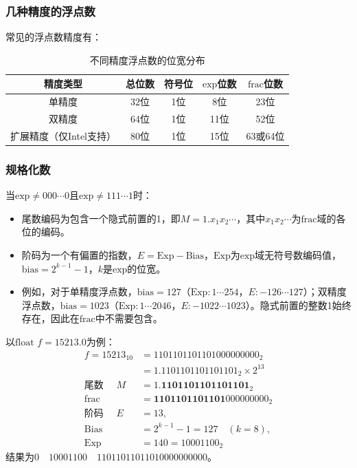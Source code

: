 \subsubsection{几种精度的浮点数}

常见的浮点数精度有：
\begin{table}[h]
    \centering
    \begin{tabular}{|c|c|c|c|c|}
        \hline
        精度类型           & 总位数 & 符号位 & \(\text{exp}\)位数 & \(\text{frac}\)位数 \\
        \hline
        单精度            & 32位 & 1位  & 8位               & 23位               \\
        双精度            & 64位 & 1位  & 11位              & 52位               \\
        扩展精度（仅Intel支持） & 80位 & 1位  & 15位              & 63或64位            \\
        \hline
    \end{tabular}
    \caption{不同精度浮点数的位宽分布}
\end{table}

\subsubsection{规格化数}
当\(\text{exp}\neq000\cdots0\)且\(\text{exp}\neq111\cdots1\)时：
\begin{itemize}
    \item 尾数编码为包含一个隐式前置的1，即\(M = 1.x_1 x_2{\cdots}\)，其中\(x_1x_2\cdots\)为\(\text{frac}\)域的各位的编码。
    \item 阶码为一个有偏置的指数，\(E=\text{Exp}-\text{Bias}\)，\(\text{Exp}\)为\(\text{exp}\)域无符号数编码值，\(\text{bias}=2^{k - 1}-1\)，\(k\)是\(\text{exp}\)的位宽。
    \item 例如，对于单精度浮点数，\(\text{bias}=127\)（\(\text{Exp}:1\cdots254\)，\(E:-126\cdots127\)）；双精度浮点数，\(\text{bias}=1023\)（\(\text{Exp}:1\cdots2046\)，\(E:-1022\cdots1023\)）。隐式前置的整数1始终存在，因此在\(\text{frac}\)中不需要包含。
\end{itemize}
以\(\text{float }f = 15213.0\)为例：
\begin{align*}
    f=15213_{10}      & =1101101101101000000000_{2}           \\
                      & =1.1101101101101101_{2}\times2^{13}   \\
    \text{尾数 }\quad M & =1.\textbf{1101101101101101}_{2}      \\
    \text{frac}       & =\textbf{1101101101101} 000000000_{2} \\
    \text{阶码 }\quad E & =13,                                  \\
    \text{Bias}       & =2^{k-1}-1=127\quad(k=8),             \\
    \text{Exp}        & =140 = 10001100_{2}
\end{align*}
结果为\(0\quad10001100  \quad11011011011010000000000\)。

